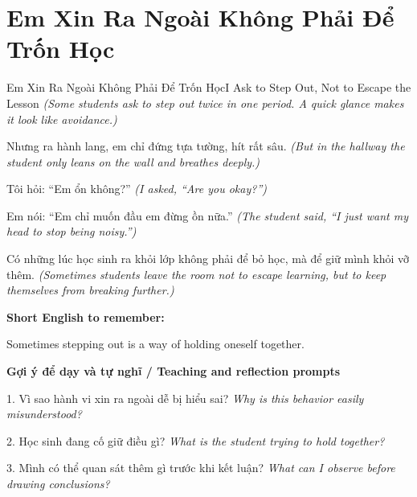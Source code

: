 \section{Em Xin Ra Ngoài Không Phải Để Trốn Học}
\begin{truyen}{Em Xin Ra Ngoài Không Phải Để Trốn Học}{I Ask to Step Out, Not to Escape the Lesson}
\textit{(Some students ask to step out twice in one period. A quick glance makes it look like avoidance.)}

Nhưng ra hành lang, em chỉ đứng tựa tường, hít rất sâu.
\textit{(But in the hallway the student only leans on the wall and breathes deeply.)}

Tôi hỏi: “Em ổn không?”
\textit{(I asked, “Are you okay?”)}

Em nói: “Em chỉ muốn đầu em đừng ồn nữa.”
\textit{(The student said, “I just want my head to stop being noisy.”)}

\end{truyen}

\begin{baihoc}
Có những lúc học sinh ra khỏi lớp không phải để bỏ học, mà để giữ mình khỏi vỡ thêm.
\textit{(Sometimes students leave the room not to escape learning, but to keep themselves from breaking further.)}
\end{baihoc}

\begin{ghinhoanh}
\textbf{Short English to remember:}

Sometimes stepping out is a way of holding oneself together.

\end{ghinhoanh}

\begin{tuhocnhanh}
\textbf{Gợi ý để dạy và tự nghĩ / Teaching and reflection prompts}

1. Vì sao hành vi xin ra ngoài dễ bị hiểu sai? \textit{Why is this behavior easily misunderstood?}

2. Học sinh đang cố giữ điều gì? \textit{What is the student trying to hold together?}

3. Mình có thể quan sát thêm gì trước khi kết luận? \textit{What can I observe before drawing conclusions?}
\end{tuhocnhanh}
\ngancach

